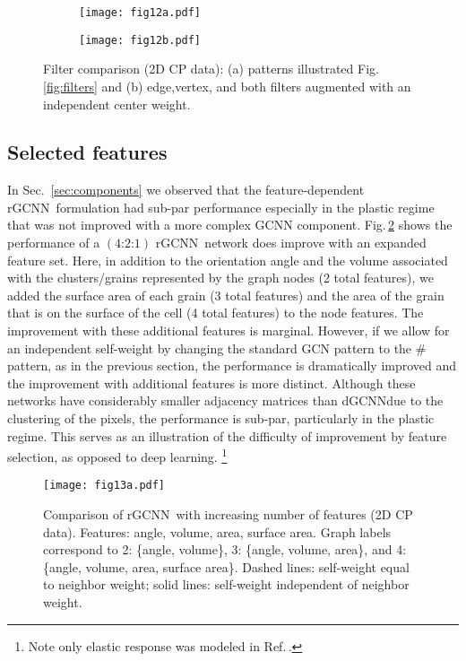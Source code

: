\documentclass[12pt,reqno]{article}
\newcommand{\fref}[1]{Fig.\,\ref{#1}}
\newcommand{\sref}[1]{Sec.\!~\ref{#1}}
\newcommand{\cref}[1]{Ref.\,\cite{#1}}
\newcommand{\DGCNN}{{dGCNN}}
\newcommand{\RGCNN}{{rGCNN}}
\newcommand{\arch}[3]{({#1}\text{:}{#2}\text{:}{#3})}
\begin{document}
\begin{figure}
\centering
\begin{subfigure}[c]{0.55\textwidth}
{\texttt{[image: fig12a.pdf]}}
\caption{}
\end{subfigure}
\begin{subfigure}[c]{0.55\textwidth}
{\texttt{[image: fig12b.pdf]}}
\caption{}
\end{subfigure}
\caption{Filter comparison (2D CP data):
(a) patterns illustrated \fref{fig:filters} and
(b) edge,vertex, and both filters augmented with an independent center weight.
}
\label{fig:filter_comparison}
\end{figure}


\subsection{Selected features} \label{sec:features}

In \sref{sec:components} we observed that the feature-dependent \RGCNN~formulation had sub-par performance especially in the plastic regime that was not improved with a more complex GCNN component.
\fref{fig:feature_comparison} shows the performance of a $\arch{4}{2}{1}$ \RGCNN~network does improve with an expanded feature set.
Here, in addition to the orientation angle and the volume associated with the clusters/grains represented by the graph nodes (2 total features), we added the surface area of each grain (3 total features) and the area of the grain that is on the surface of the cell (4 total features) to the node features.
The improvement with these additional features is marginal.
However, if we allow for an independent self-weight by changing the standard GCN pattern to the \# pattern, as in the previous section, the performance is dramatically improved and the improvement with additional features is more distinct.
Although these networks have considerably smaller adjacency matrices than \DGCNN due to the clustering of the pixels, the performance is sub-par, particularly in the plastic regime.
This serves as an illustration of the difficulty of improvement by feature selection, as opposed to deep learning.%
\footnote{Note only elastic response was modeled in \cref{vlassis2020geometric}.}

\begin{figure}
\centering
{\texttt{[image: fig13a.pdf]}}
\caption{Comparison of \RGCNN~with increasing number of features (2D CP data).
Features: angle, volume, area, surface area.
Graph labels correspond to
2: \{angle, volume\},
3: \{angle, volume, area\}, and
4: \{angle, volume, area, surface area\}.
Dashed lines: self-weight equal to neighbor weight; solid lines: self-weight independent of neighbor weight.
}
\label{fig:feature_comparison}
\end{figure}
\end{document}
